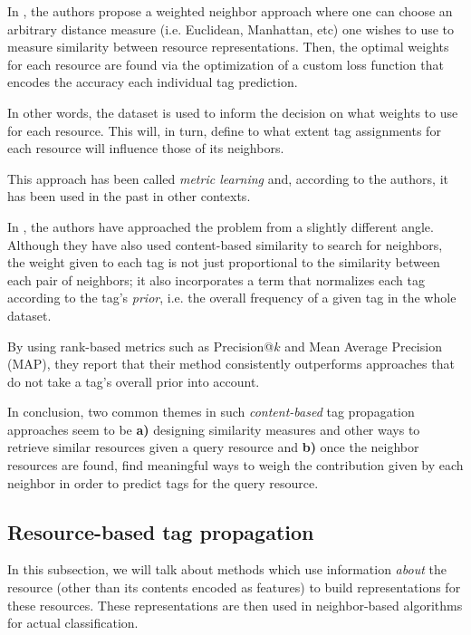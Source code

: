In \cite{guillaumin_etal_2009}, the authors propose a weighted neighbor approach where one can choose an arbitrary distance measure (i.e. Euclidean, Manhattan, etc) one wishes to use to measure similarity between resource representations. Then, the optimal weights for each resource are found via the optimization of a custom loss function that encodes the accuracy each individual tag prediction. 

In other words, the dataset is used to inform the decision on what weights to use for each resource. This will, in turn, define to what extent tag assignments for each resource will influence those of its neighbors.

This approach has been called \textit{metric learning} and, according to the authors, it has been used in the past in other contexts.

In \cite{li_etal_2009}, the authors have approached the problem from a slightly different angle. Although they have also used content-based similarity to search for neighbors, the weight given to each tag is not just proportional to the similarity between each pair of neighbors; it also incorporates a term that normalizes each tag according to the tag's \textit{prior}, i.e. the overall frequency of a given tag in the whole dataset.

By using rank-based metrics such as Precision@$k$ and Mean Average Precision (MAP), they report that their method consistently outperforms approaches that do not take a tag's overall prior into account.

In conclusion, two common themes in such \textit{content-based} tag propagation approaches seem to be \textbf{a)} designing similarity measures and other ways to retrieve similar resources given a query resource and \textbf{b)} once the neighbor resources are found, find meaningful ways to weigh the contribution given by each neighbor in order to predict tags for the query resource. 

\subsection{Resource-based tag propagation}

In this subsection, we will talk about methods which use information \textit{about} the resource (other than its contents encoded as features) to build representations for these resources. These representations are then used in neighbor-based algorithms for actual classification.


